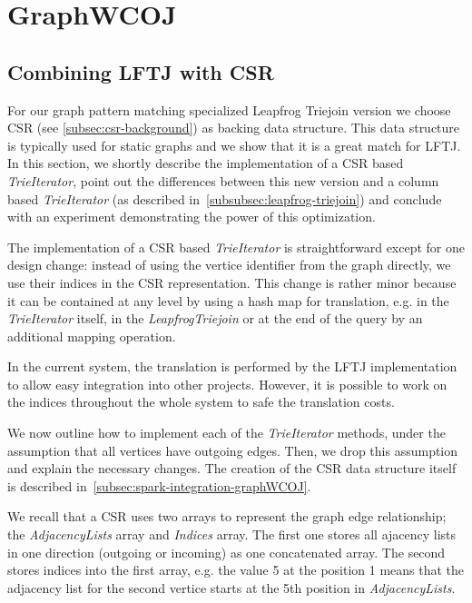 \section{Graph\textsc{WCOJ}} \label{sec:graphwcoj}

\subsection{Combining \textsc{LFTJ} with \textsc{CSR}} \label{subsec:graphWCOJ-csr}
For our graph pattern matching specialized Leapfrog Triejoin version we choose \textsc{CSR} (see \cref{subsec:csr-background}) as
backing data structure.
This data structure is typically used for static graphs and we show that it is a great match for \textsc{LFTJ}.
In this section, we shortly describe the implementation of a \textsc{CSR} based \textit{TrieIterator}, point out the differences between
this new version and a column based \textit{TrieIterator} (as described in~\cref{subsubsec:leapfrog-triejoin}) and conclude with an experiment demonstrating
the power of this optimization.

The implementation of a \textsc{CSR} based \textit{TrieIterator} is straightforward except for one design change: instead of using
the vertice identifier from the graph directly, we use their indices in the \textsc{CSR} representation.
This change is rather minor because it can be contained at any level by using a hash map for translation, e.g. in the
\textit{TrieIterator} itself, in the \textit{LeapfrogTriejoin} or at the end of the query by an additional mapping operation.

In the current system, the translation is performed by the \textsc{LFTJ} implementation to allow easy integration into other projects.
However, it is possible to work on the indices throughout the whole system to safe the translation costs.

We now outline how to implement each of the \textit{TrieIterator} methods, under the assumption that all vertices have outgoing edges.
Then, we drop this assumption and explain the necessary changes.
The creation of the \textsc{CSR} data structure itself is described in~\cref{subsec:spark-integration-graphWCOJ}.

We recall that a CSR uses two arrays to represent the graph edge relationship;
the \textit{AdjacencyLists} array and \textit{Indices} array.
The first one stores all ajacency lists in one direction (outgoing or incoming) as one concatenated array.
The second stores indices into the first array, e.g. the value 5 at the position 1 means that the adjacency list
for the second vertice starts at the 5th position in \textit{AdjacencyLists}.

